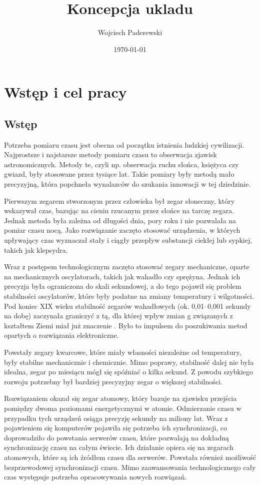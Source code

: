 \documentclass[../main.tex]{subfiles}
\author{Wojciech Paderewski}
\date{\today}
\title{Koncepcja ukladu}
\begin{document}
 \section{Wstęp i cel pracy}
 
 \subsection{Wstęp}
 Potrzeba pomiaru czasu jest obecna od początku istnienia ludzkiej cywilizacji. 
 Najprostsze i najstarsze metody pomiaru czasu to obserwacja zjawisk astronomicznych.
 Metody te, czyli np. obserwacja ruchu słońca, księżyca czy gwiazd, były stosowane przez tysiące lat.
  Takie pomiary były metodą mało precyzyjną, która popchneła wynalazców do szukania innowacji w tej dziedzinie.
 
 Pierwszym zegarem stworzonym przez człowieka był zegar słoneczny, który wskazywał czas, 
 bazując na cieniu rzucanym przez słońce na tarczę zegara. Jednak metoda była zależna od długości dnia, 
 pory roku i nie pozwalała na pomiar czasu nocą.
 Jako rozwiązanie zaczęto stosować urządzenia, w których upływający czas wyznaczał stały i ciągły przepływ 
 substancji ciekłej lub sypkiej, takich jak klepsydra.
 
 Wraz z postępem technologicznym zaczęto stosować zegary mechaniczne, oparte na mechanicznych oscylatorach,
  takich jak wahadło czy sprężyna. Jednak ich precyzja była ograniczona do skali sekundowej, 
  a do tego pojawił się problem stabilności oscylatorów, które były podatne na zmiany temperatury i wilgotności.
   Pod koniec XIX wieku stabilność zegarów wahadłowych (ok. 0,01–0,001 sekundy na dobę) zaczynała graniczyć z tą, 
   dla której wpływ zmian g związanych z kształtem Ziemi miał już znaczenie \cite{st:czas}.
    Było to impulsem do poszukiwania metod opartych o rozwiązania elektroniczne.
 
 Powstały zegary kwarcowe, które miały własności niezależne od temperatury, były stabilne mechanicznie i chemicznie.
 Mimo poprawy, stabilność dalej nie była idealna, zegar po miesiącu mógł się spóźniać o kilka sekund. 
 Z powodu szybkiego rozwoju potrzebny był bardziej precyzyjny zegar o większej stabilności.
 
 Rozwiązaniem okazał się zegar atomowy, który bazuje na zjawisku przejścia pomiędzy dwoma poziomami energetycznymi
  w atomie. Odmierzanie czasu w przypadku tych urządzeń osiąga precyzję sekundy na miliony lat.
  Wraz z pojawieniem się komputerów pojawiła się potrzeba ich synchronizacji, co doprowadziło do powstania
   serwerów czasu, które pozwalają na dokładną synchronizację czasu na całym świecie. Ich działanie opiera się na
    zegarach atomowych, które są ich źródłem czasu dla serwerów. 
   Powstała również możliwość bezprzewodowej synchronizacji czasu. Mimo zaawansowania technologicznego cały czas 
   występuje potrzeba opracowywania nowych rozwiązań.
 
\end{document}

